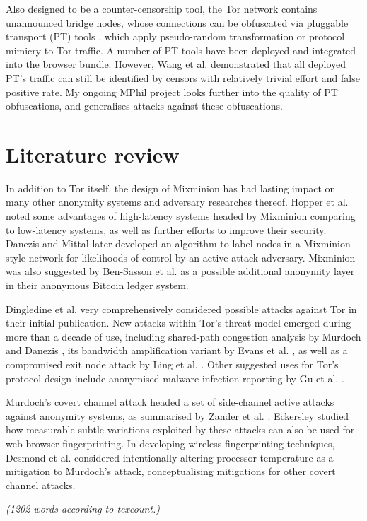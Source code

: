 \documentclass[11pt]{article}
\begin{document}
Also designed to be a counter-censorship tool, the Tor network contains unannounced bridge nodes, whose connections can be obfuscated via pluggable transport (PT) tools \cite[p. 17]{dingledine2014tor}, which apply pseudo-random transformation or protocol mimicry to Tor traffic. A number of PT tools have been deployed and integrated into the browser bundle. However, Wang et al. \cite{wang2015seeing} demonstrated that all deployed PT's traffic can still be identified by censors with relatively trivial effort and false positive rate. My ongoing MPhil project looks further into the quality of PT obfuscations, and generalises attacks against these obfuscations.

\section{Literature review}

In addition to Tor \cite{dingledine2014tor} itself, the design of Mixminion \cite{danezis2003mixminion} has had lasting impact on many other anonymity systems and adversary researches thereof. Hopper et al. \cite{hopper2010much} noted some advantages of high-latency systems headed by Mixminion comparing to low-latency systems, as well as further efforts to improve their security. Danezis and Mittal \cite{danezis2009sybilinfer} later developed an algorithm to label nodes in a Mixminion-style network for likelihoods of control by an active attack adversary. Mixminion was also suggested by Ben-Sasson et al. \cite{sasson2014zerocash} as a possible additional anonymity layer in their anonymous Bitcoin ledger system.

Dingledine et al. \cite{dingledine2014tor} very comprehensively considered possible attacks against Tor in their initial publication. New attacks within Tor's threat model emerged during more than a decade of use, including shared-path congestion analysis by Murdoch and Danezis \cite{murdoch2005low}, its bandwidth amplification variant by Evans et al. \cite{evans2009practical}, as well as a compromised exit node attack by Ling et al. \cite{ling2009new}. Other suggested uses for Tor's protocol design include anonymised malware infection reporting by Gu et al. \cite{gu2007bothunter}.

Murdoch's covert channel attack \cite{murdoch2006hot} headed a set of side-channel active attacks against anonymity systems, as summarised by Zander et al. \cite{zander2007survey}. Eckersley \cite{eckersley2010unique} studied how measurable subtle variations exploited by these attacks can also be used for web browser fingerprinting. In developing wireless fingerprinting techniques, Desmond et al. \cite{desmond2008identifying} considered intentionally altering processor temperature as a mitigation to Murdoch's attack, conceptualising mitigations for other covert channel attacks.

\emph{(1202 words according to texcount.)}


\footnotesize{}
\end{document}
